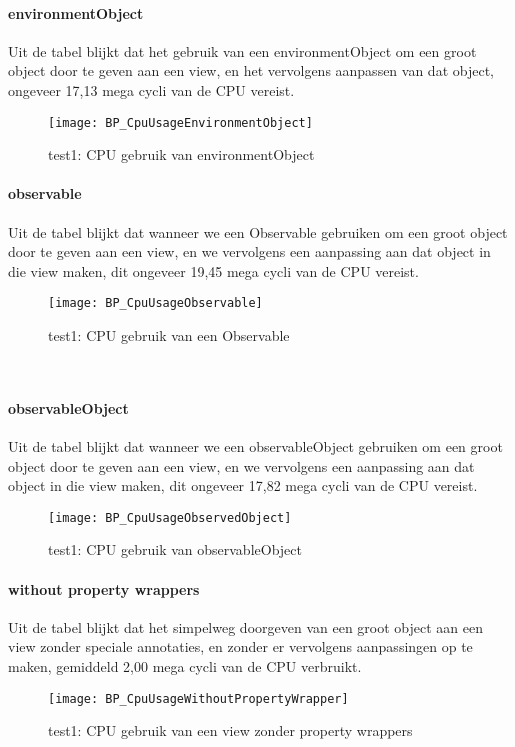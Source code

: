 \paragraph{environmentObject}
Uit de tabel blijkt dat het gebruik van een environmentObject om een groot object door te geven aan een view, en het vervolgens aanpassen van dat object, ongeveer 17,13 mega cycli van de CPU vereist.
\begin{figure}[htbp]
    \centering
    \texttt{[image: BP\_CpuUsageEnvironmentObject]} 
    \caption{test1: CPU gebruik van environmentObject}
    \label{fig:cpuEnvironmentObject}
\end{figure}

\paragraph{observable}
Uit de tabel blijkt dat wanneer we een Observable gebruiken om een groot object door te geven aan een view, en we vervolgens een aanpassing aan dat object in die view maken, dit ongeveer 19,45 mega cycli van de CPU vereist.
\begin{figure}[htbp]
    \centering
    \texttt{[image: BP\_CpuUsageObservable]} 
    \caption{test1: CPU gebruik van een Observable}
    \label{fig:cpuObservable}
\end{figure}\

\paragraph{observableObject}
Uit de tabel blijkt dat wanneer we een observableObject gebruiken om een groot object door te geven aan een view, en we vervolgens een aanpassing aan dat object in die view maken, dit ongeveer 17,82 mega cycli van de CPU vereist.
\begin{figure}[htbp]
    \centering
    \texttt{[image: BP\_CpuUsageObservedObject]} 
    \caption{test1: CPU gebruik van observableObject}
    \label{fig:cpuObservedObject}
\end{figure}

\paragraph{without property wrappers}
Uit de tabel blijkt dat het simpelweg doorgeven van een groot object aan een view zonder speciale annotaties, en zonder er vervolgens aanpassingen op te maken, gemiddeld 2,00 mega cycli van de CPU verbruikt.
\begin{figure}[htbp]
    \centering
    \texttt{[image: BP\_CpuUsageWithoutPropertyWrapper]} 
    \caption{test1: CPU gebruik van een view zonder property wrappers}
    \label{fig:cpuWithoutPropertyWrapper}
\end{figure}


